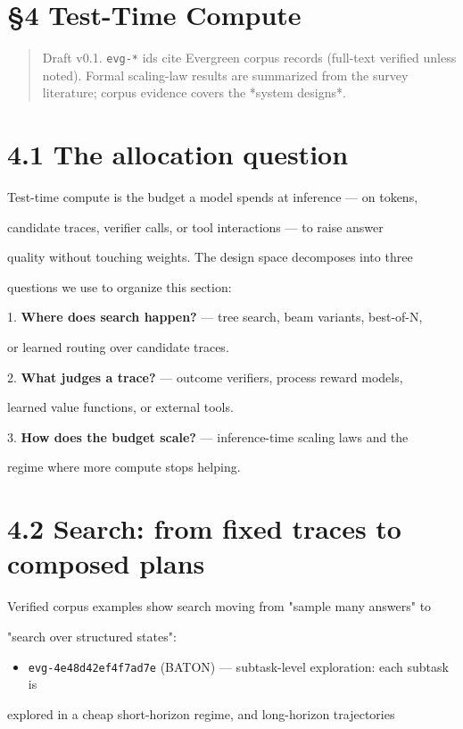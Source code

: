 \documentclass[11pt]{article}
\begin{document}
\section*{\S4 Test-Time Compute}

\begin{quote}Draft v0.1. \texttt{evg-*} ids cite Evergreen corpus records (full-text verified unless noted). Formal scaling-law results are summarized from the survey literature; corpus evidence covers the *system designs*.\end{quote}

\section{4.1 The allocation question}

Test-time compute is the budget a model spends at inference --- on tokens,

candidate traces, verifier calls, or tool interactions --- to raise answer

quality without touching weights. The design space decomposes into three

questions we use to organize this section:


1. \textbf{Where does search happen?} --- tree search, beam variants, best-of-N,

or learned routing over candidate traces.

2. \textbf{What judges a trace?} --- outcome verifiers, process reward models,

learned value functions, or external tools.

3. \textbf{How does the budget scale?} --- inference-time scaling laws and the

regime where more compute stops helping.


\section{4.2 Search: from fixed traces to composed plans}

Verified corpus examples show search moving from "sample many answers" to

"search over structured states":


\begin{itemize}
\item \texttt{evg-4e48d42ef4f7ad7e} (BATON) --- subtask-level exploration: each subtask is
\end{itemize}
explored in a cheap short-horizon regime, and long-horizon trajectories
\end{document}
